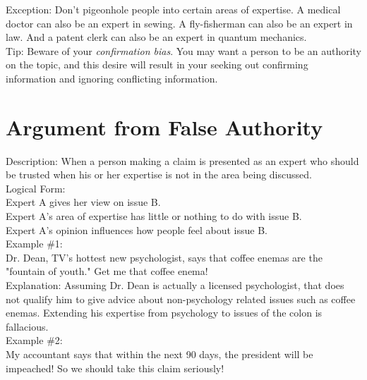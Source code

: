 \documentclass[a4paper,12pt,single,pdftex]{scrbook}
\begin{document}
    
      Exception: Don’t pigeonhole people into certain areas of expertise. A medical doctor can also be an expert in sewing. A fly-fisherman can also be an expert in law. And a patent clerk can also be an expert in quantum mechanics.
    \\

    
      Tip: Beware of your {\it confirmation bias}. You may want a person to be an authority on the topic, and this desire will result in your seeking out confirming information and ignoring conflicting information.
    \\

    \chapter{
      Argument from False Authority
    }
  
    

    
      Description: When a person making a claim is presented as an expert who should be trusted when his or her expertise is not in the area being discussed.
    \\

    
      Logical Form:
    \\

    
      Expert A gives her view on issue B.
    \\

    
      Expert A's area of expertise has little or nothing to do with issue B.
    \\

    
      Expert A's opinion influences how people feel about issue B.
    \\

    
      Example \#1:
    \\

    
      Dr. Dean, TV's hottest new psychologist, says that coffee enemas are the "fountain of youth." Get me that coffee enema!
    \\

    
      Explanation: Assuming Dr. Dean is actually a licensed psychologist, that does not qualify him to give advice about non-psychology related issues such as coffee enemas. Extending his expertise from psychology to issues of the colon is fallacious.
    \\

    
      Example \#2:
    \\

    
      My accountant says that within the next 90 days, the president will be impeached! So we should take this claim seriously!
    \\
\end{document}

